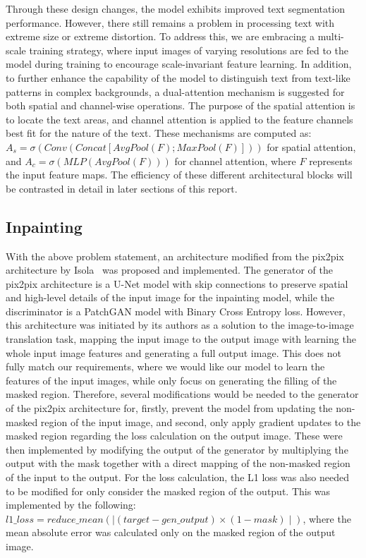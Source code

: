 \documentclass[10pt,twocolumn,letterpaper]{article}
\begin{document}
Through these design changes, the model exhibits improved text segmentation performance. However, there still remains a problem 
in processing text with extreme size or extreme distortion. To address this, we are embracing a multi-scale training strategy, where input images of varying resolutions 
are fed to the model during training to encourage scale-invariant feature learning. In addition, to further enhance the capability of the model 
to distinguish text from text-like patterns in complex backgrounds, a dual-attention mechanism is suggested for both spatial and channel-wise operations. 
The purpose of the spatial attention is to locate the text areas, and channel attention is applied to the feature channels best fit for the nature of the text. 
These mechanisms are computed as: $A_s = \sigma(Conv(Concat[AvgPool(F); MaxPool(F)]))$ for spatial attention, and $A_c = \sigma(MLP(AvgPool(F)))$ 
for channel attention, where $F$ represents the input feature maps. The efficiency of these different architectural blocks will be contrasted 
in detail in later sections of this report.

\subsection{Inpainting}

With the above problem statement, an architecture modified from the pix2pix architecture by Isola~\etal\cite{Isola2018} was proposed and implemented. The generator of the pix2pix architecture is
a U-Net model with skip connections to preserve spatial and high-level details of the input image for the inpainting model, while the discriminator is a PatchGAN
model with Binary Cross Entropy loss. However, this architecture was initiated by its authors as a solution to the image-to-image translation task, mapping the input image to the output image 
with learning the whole input image features and generating a full output image. This does not fully match our requirements, where we would like our model to learn the features of the input images, 
while only focus on generating the filling of the masked region. Therefore, several modifications would be needed to the generator of the pix2pix architecture for, firstly, prevent the model from updating
the non-masked region of the input image, and second, only apply gradient updates to the masked region regarding the loss calculation on the output image. These were then implemented by modifying 
the output of the generator by multiplying the output with the mask together with a direct mapping of the non-masked region of the input to the output. For the loss calculation, the L1 loss was 
also needed to be modified for only consider the masked region of the output. This was implemented by the following: $l1\_loss = reduce\_mean(\mid(target - gen\_output) \times (1 - mask)\mid)$, 
where the mean absolute error was calculated only on the masked region of the output image.
\end{document}
